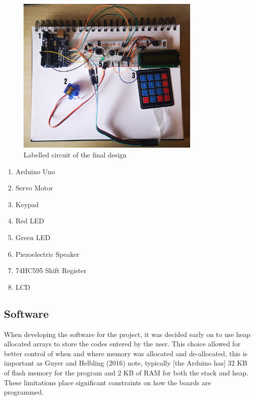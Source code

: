   \newpage

  \begin{figure}[h]
    \begin{center}
    \includegraphics[width=0.8\textwidth]{labelled.jpg}
    \caption{Labelled circuit of the final design}
    \end{center}
  \end{figure}
  \begin{enumerate}
  \item Arduino Uno
  \item Servo Motor
  \item Keypad
  \item Red LED
  \item Green LED
  \item Piezoelectric Speaker
  \item 74HC595 Shift Register
  \item LCD
  \end{enumerate}
  \subsection*{Software}
  When developing the software for the project, it was decided early on to use heap allocated arrays to store the codes entered by the user.
  This choice allowed for better control of when and where memory was allocated and de-allocated, this is important as Guyer and Helbling (2016) note, typically [the Arduino has] 32 KB of flash memory for the program  and  2  KB  of  RAM  for  both  the  stack  and  heap.
  These limitations place significant constraints on how the boards are programmed.

  

